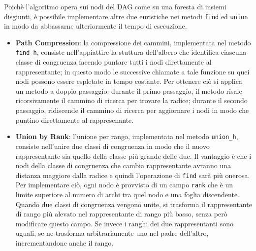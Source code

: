 \documentclass[a4paper,11pt]{article}
\begin{document}
Poichè l'algoritmo opera sui nodi del DAG come su una foresta di insiemi 
disgiunti, è possibile implementare altre due euristiche nei metodi 
\texttt{find} ed \texttt{union} in modo da abbassarne ulteriormente 
il tempo di esecuzione.
\begin{itemize}
\item {\bf Path Compression}: la compressione dei cammini, implementata 
nel metodo \texttt{find\_h}, consiste nell'appiattire la stuttura 
dell'albero che identifica ciascuna classe di congruenza facendo puntare
tutti i nodi direttamente al rappresentante; in questo modo le successive 
chiamate a tale funzione su quei nodi possono essere espletate in 
tempo costante. Per ottenere ciò si applica un metodo a doppio 
passaggio: durante il primo passaggio, il metodo risale ricorsivamente 
il cammino di ricerca per trovare la radice; durante il secondo passaggio, 
ridiscende il cammino di ricerca per aggiornare i nodi in modo che 
puntino direttamente al rappresenante.
\item {\bf Union by Rank}: l'unione per rango, implementata nel metodo 
\texttt{union\_h}, consiste nell'unire due classi di congruenza in 
modo che il nuovo rappresentante sia quello della classe più grande 
delle due. Il vantaggio è che i nodi della classe di congruenza che 
cambia rappresentante avranno una distanza maggiore dalla radice e 
quindi l'operazione di \texttt{find} sarà più onerosa. Per implementare 
ciò, ogni nodo è provvisto di un campo \texttt{rank} che è un limite 
superiore al numero di archi tra quel nodo e una foglia discendente.
Quando due classi di congruenza vengono unite, si trasforma il 
rappresentante di rango più alevato nel rappresentante di rango più basso, 
senza però modificare questo campo. Se invece i ranghi dei due 
rappresentanti sono uguali, se ne trasforma arbitrariamente uno nel 
padre dell'altro, incrementandone anche il rango.
\end{itemize}

\end{document}
